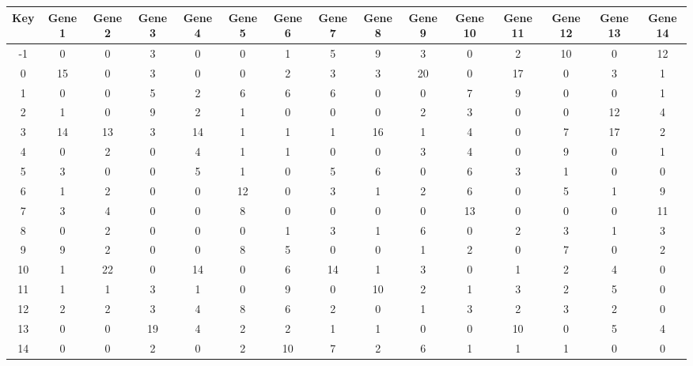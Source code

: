 \begin{tabular}{|c|c|c|c|c|c|c|c|c|c|c|c|c|c|c|}
\hline
Key & Gene 1 & Gene 2 & Gene 3 & Gene 4 & Gene 5 & Gene 6 & Gene 7 & Gene 8 & Gene 9 & Gene 10 & Gene 11 & Gene 12 & Gene 13 & Gene 14 \\
\hline
-1 & 0 & 0 & 3 & 0 & 0 & 1 & 5 & 9 & 3 & 0 & 2 & 10 & 0 & 12 \\
0 & 15 & 0 & 3 & 0 & 0 & 2 & 3 & 3 & 20 & 0 & 17 & 0 & 3 & 1 \\
1 & 0 & 0 & 5 & 2 & 6 & 6 & 6 & 0 & 0 & 7 & 9 & 0 & 0 & 1 \\
2 & 1 & 0 & 9 & 2 & 1 & 0 & 0 & 0 & 2 & 3 & 0 & 0 & 12 & 4 \\
3 & 14 & 13 & 3 & 14 & 1 & 1 & 1 & 16 & 1 & 4 & 0 & 7 & 17 & 2 \\
4 & 0 & 2 & 0 & 4 & 1 & 1 & 0 & 0 & 3 & 4 & 0 & 9 & 0 & 1 \\
5 & 3 & 0 & 0 & 5 & 1 & 0 & 5 & 6 & 0 & 6 & 3 & 1 & 0 & 0 \\
6 & 1 & 2 & 0 & 0 & 12 & 0 & 3 & 1 & 2 & 6 & 0 & 5 & 1 & 9 \\
7 & 3 & 4 & 0 & 0 & 8 & 0 & 0 & 0 & 0 & 13 & 0 & 0 & 0 & 11 \\
8 & 0 & 2 & 0 & 0 & 0 & 1 & 3 & 1 & 6 & 0 & 2 & 3 & 1 & 3 \\
9 & 9 & 2 & 0 & 0 & 8 & 5 & 0 & 0 & 1 & 2 & 0 & 7 & 0 & 2 \\
10 & 1 & 22 & 0 & 14 & 0 & 6 & 14 & 1 & 3 & 0 & 1 & 2 & 4 & 0 \\
11 & 1 & 1 & 3 & 1 & 0 & 9 & 0 & 10 & 2 & 1 & 3 & 2 & 5 & 0 \\
12 & 2 & 2 & 3 & 4 & 8 & 6 & 2 & 0 & 1 & 3 & 2 & 3 & 2 & 0 \\
13 & 0 & 0 & 19 & 4 & 2 & 2 & 1 & 1 & 0 & 0 & 10 & 0 & 5 & 4 \\
14 & 0 & 0 & 2 & 0 & 2 & 10 & 7 & 2 & 6 & 1 & 1 & 1 & 0 & 0 \\
\hline
\end{tabular}